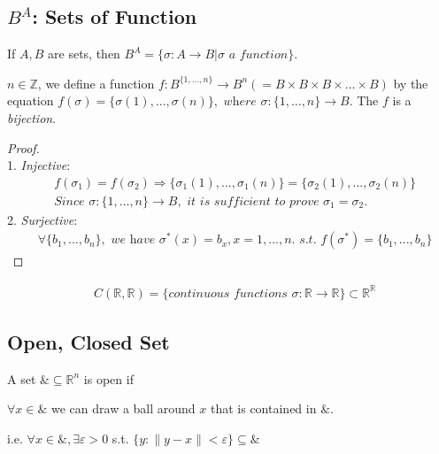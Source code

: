 \documentclass[11pt]{elegantbook}
\begin{document}
\subsection{$B^A$: Sets of Function}
If $A,B$ are sets, then $B^A=\{\sigma:A \rightarrow B| \sigma \textit{ a function}\}$.
\begin{example}
    $n\in \mathbb{Z}$, we define a function $f: B^{\{1,\dots,n\}} \rightarrow B^n(=B\times B\times B\times \dots \times B)$ by the equation
    $f(\sigma)=\{\sigma(1),...,\sigma(n)\}, \textit{ where }\sigma:\{1,\dots,n\} \rightarrow B$. The $f$ is a \textit{bijection}.
\end{example}
\begin{proof}
    \quad\\
    1. \textit{Injective}:
    \begin{equation}
        \begin{aligned}
            &f(\sigma_1)=f(\sigma_2)
            \Rightarrow \{\sigma_1(1),...,\sigma_1(n)\}=\{\sigma_2(1),...,\sigma_2(n)\}\\
            &\textit{Since }\sigma:\{1,\dots,n\} \rightarrow B,\textit{ it is sufficient to prove }\sigma_1=\sigma_2.
        \end{aligned}
        \nonumber
    \end{equation}
    2. \textit{Surjective}:
    \begin{equation}
        \begin{aligned}
            &\forall \{b_1,...,b_n\},\textit{ we have }\sigma^*(x)=b_x,x=1,...,n.\textit{ s.t. }f(\sigma^*)=\{b_1,...,b_n\}
        \end{aligned}
        \nonumber
    \end{equation}

\end{proof}
\begin{example}
    \begin{equation}
        \begin{aligned}
            & C(\mathbb{R},\mathbb{R})=\{\textit{continuous functions }\sigma:\mathbb{R} \rightarrow \mathbb{R} \}\subset \mathbb{R}^\mathbb{R}
        \end{aligned}
        \nonumber
    \end{equation}
\end{example}

\subsection{Open, Closed Set}
\begin{definition}
    A set $\& \subseteq \mathbb{R}^{n}$ is open if
    
    $\forall x \in \&$ we can draw a ball around $x$ that is contained in $\&$.

    i.e. $\forall x \in \&, \exists \varepsilon>0$ s.t. $\{y:\|y-x\|<\varepsilon\} \subseteq \&$
\end{definition}
\end{document}
